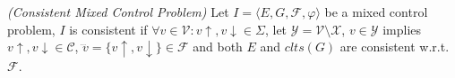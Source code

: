 \begin{definition}
	\label{def:consistent_mixed_control_problem} \emph{(Consistent Mixed Control Problem)} 
	Let $I = \langle E, G, \mathcal{F}, \varphi \rangle$ be a mixed control problem, $I$ is consistent if $\forall v \in \mathcal{V}: v\uparrow, v\downarrow \in \Sigma$, let
	$\mathcal{Y} = \mathcal{V}\setminus \mathcal{X}$, $v \in \mathcal{Y}$ implies $v\uparrow, v\downarrow \in \mathcal{C}$, $\dddot{v} = \lbrace v\uparrow, v\downarrow \rbrace \in \mathcal{F}$ and both $E$ and $clts(G)$ are consistent w.r.t. $\mathcal{F}$.
\end{definition}
